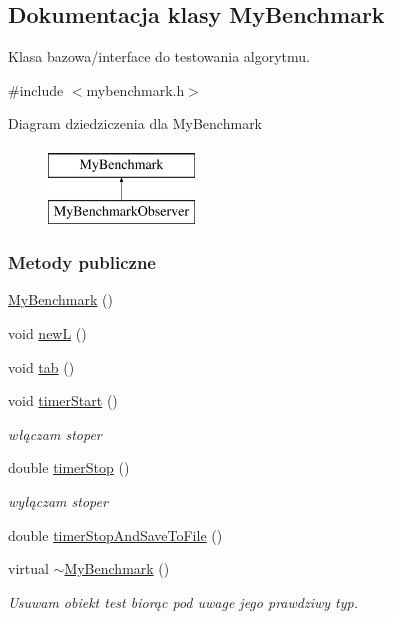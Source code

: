 \hypertarget{class_my_benchmark}{\subsection{Dokumentacja klasy My\-Benchmark}
\label{class_my_benchmark}
}


Klasa bazowa/interface do testowania algorytmu.  




{\ttfamily \#include $<$mybenchmark.\-h$>$}

Diagram dziedziczenia dla My\-Benchmark\begin{figure}[H]
\begin{center}
\leavevmode
\includegraphics[height=2.000000cm]{class_my_benchmark}
\end{center}
\end{figure}
\subsubsection*{Metody publiczne}
\begin{DoxyCompactItemize}
\item 
\hyperlink{class_my_benchmark_a7f3739e8b61939627c0f63948a9975ca}{My\-Benchmark} ()
\item 
void \hyperlink{class_my_benchmark_a29b612fc55d1da88d44a6899bc89d312}{new\-L} ()
\item 
void \hyperlink{class_my_benchmark_ad2892ee2549d320f9e19060f444cb0d6}{tab} ()
\item 
void \hyperlink{class_my_benchmark_a802577db97fd440a3920add30c35a676}{timer\-Start} ()
\begin{DoxyCompactList}\small\item\em włączam stoper \end{DoxyCompactList}\item 
double \hyperlink{class_my_benchmark_a7e3fa28fab999435bd4c51d915e42809}{timer\-Stop} ()
\begin{DoxyCompactList}\small\item\em wyłączam stoper \end{DoxyCompactList}\item 
double \hyperlink{class_my_benchmark_a94dd5cae9837db8f84eae09498b1039a}{timer\-Stop\-And\-Save\-To\-File} ()
\item 
virtual \hyperlink{class_my_benchmark_a00de82c40680b41065eb402ac90f1736}{$\sim$\-My\-Benchmark} ()
\begin{DoxyCompactList}\small\item\em Usuwam obiekt test biorąc pod uwage jego prawdziwy typ. \end{DoxyCompactList}\end{DoxyCompactItemize}
